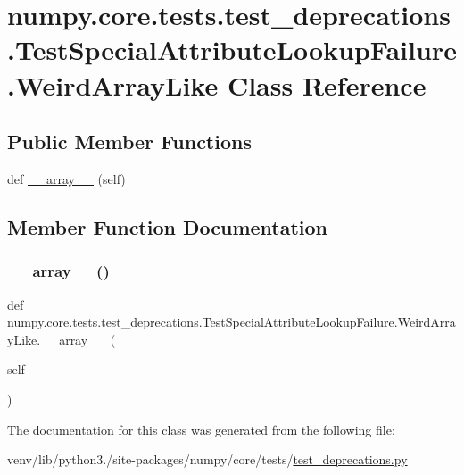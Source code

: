 \hypertarget{classnumpy_1_1core_1_1tests_1_1test__deprecations_1_1TestSpecialAttributeLookupFailure_1_1WeirdArrayLike}{}\section{numpy.\+core.\+tests.\+test\+\_\+deprecations.\+Test\+Special\+Attribute\+Lookup\+Failure.\+Weird\+Array\+Like Class Reference}
\label{classnumpy_1_1core_1_1tests_1_1test__deprecations_1_1TestSpecialAttributeLookupFailure_1_1WeirdArrayLike}
\subsection*{Public Member Functions}
\begin{DoxyCompactItemize}
\item 
def \hyperlink{classnumpy_1_1core_1_1tests_1_1test__deprecations_1_1TestSpecialAttributeLookupFailure_1_1WeirdArrayLike_a0f9f5adb1eea9294f32eca3224777797}{\+\_\+\+\_\+array\+\_\+\+\_\+} (self)
\end{DoxyCompactItemize}


\subsection{Member Function Documentation}
\mbox{\label{classnumpy_1_1core_1_1tests_1_1test__deprecations_1_1TestSpecialAttributeLookupFailure_1_1WeirdArrayLike_a0f9f5adb1eea9294f32eca3224777797}} 
\subsubsection{\texorpdfstring{\+\_\+\+\_\+array\+\_\+\+\_\+()}{\_\_array\_\_()}}
{\footnotesize\ttfamily def numpy.\+core.\+tests.\+test\+\_\+deprecations.\+Test\+Special\+Attribute\+Lookup\+Failure.\+Weird\+Array\+Like.\+\_\+\+\_\+array\+\_\+\+\_\+ (\begin{DoxyParamCaption}\item[{}]{self }\end{DoxyParamCaption})}



The documentation for this class was generated from the following file\+:\begin{DoxyCompactItemize}
\item 
venv/lib/python3./site-\/packages/numpy/core/tests/\hyperlink{core_2tests_2test__deprecations_8py}{test\+\_\+deprecations.\+py}\end{DoxyCompactItemize}
